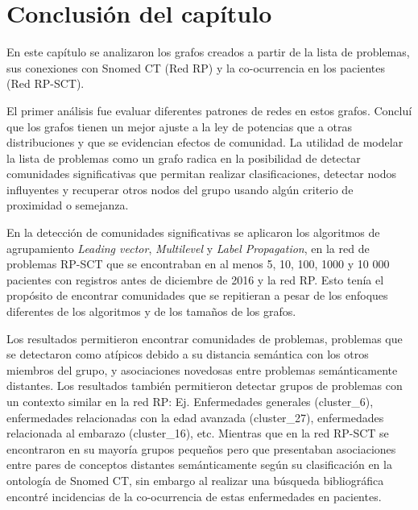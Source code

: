 \section{Conclusión del capítulo}
En este capítulo se analizaron los grafos creados a partir de la lista de problemas, sus conexiones con Snomed CT (Red \acrshort{RP}) y la co-ocurrencia en los pacientes (Red \acrshort{RP-SCT}).

El primer análisis fue evaluar diferentes patrones de redes en estos grafos. Concluí que los grafos tienen un mejor ajuste a la ley de potencias que a otras distribuciones y que se evidencian efectos de comunidad. La utilidad de modelar la lista de problemas como un grafo radica en la posibilidad de detectar comunidades significativas que permitan realizar clasificaciones, detectar nodos influyentes y recuperar otros nodos del grupo usando algún criterio de proximidad o semejanza.

En la detección de comunidades significativas se aplicaron los algoritmos de agrupamiento \textit{Leading vector}, \textit{Multilevel} y \textit{Label Propagation}, en la red de problemas \acrshort{RP-SCT} que se encontraban en al menos 5, 10, 100, 1000 y 10 000 pacientes con registros antes de diciembre de 2016 y la red \acrshort{RP}. Esto tenía el propósito de encontrar comunidades que se repitieran a pesar de los enfoques diferentes de los algoritmos y de los tamaños de los grafos. 

Los resultados permitieron encontrar comunidades de problemas, problemas que se detectaron como atípicos debido a su distancia semántica con los otros miembros del grupo, y asociaciones novedosas entre problemas semánticamente distantes.  Los resultados también permitieron detectar grupos de problemas con un contexto similar en la red \acrshort{RP}: Ej. Enfermedades generales (cluster\_6), enfermedades relacionadas con la edad avanzada (cluster\_27), enfermedades relacionada al embarazo (cluster\_16), etc. Mientras que en la red \acrshort{RP-SCT} se encontraron en su mayoría grupos pequeños pero que presentaban asociaciones entre pares de conceptos distantes semánticamente según su clasificación en la ontología de Snomed CT, sin embargo al realizar una búsqueda bibliográfica encontré incidencias de la co-ocurrencia de estas enfermedades en pacientes.

